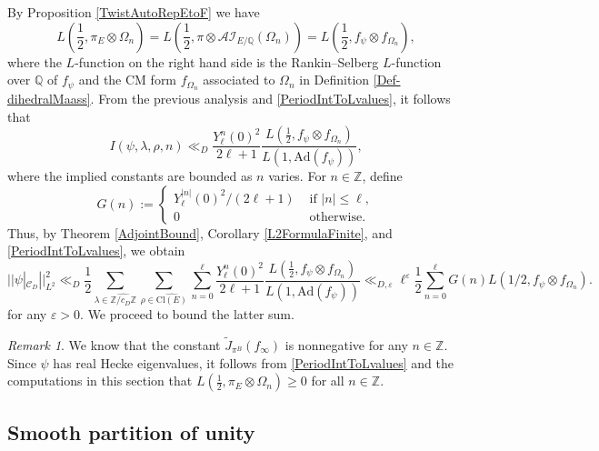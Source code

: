 \documentclass[11pt]{amsart}
\newcommand{\Z}{\mathbb{Z}}
\newcommand{\Q}{\mathbb{Q}}
\theoremstyle{definition}
\theoremstyle{remark}
\newtheorem{remark}[theorem]{Remark}
\begin{document}
By Proposition \ref{TwistAutoRepEtoF} we have $$ L\left(\frac{1}{2}, \pi_E \otimes \Omega_n \right) =  L\left(\frac{1}{2}, \pi \otimes \mathcal{AI}_{E/\Q}(\Omega_n)\right) = L\left( \frac{1}{2}, f_{\psi}\otimes f_{\Omega_n} \right),$$ where the $L$-function on the right hand side is the Rankin--Selberg $L$-function over $\Q$ of $f_{\psi}$ and the CM form $f_{\Omega_n}$ associated to $\Omega_n$ in Definition \ref{Def-dihedralMaass}. From the previous analysis and \eqref{PeriodIntToLvalues}, it follows that $$ I(\psi, \lambda, \rho, n) \ll_{D} \frac{Y_{\ell}^{n}(0)^2}{2\ell+1} \frac{L(\frac{1}{2},f_{\psi}\otimes f_{\Omega_n})}{L(1,\mathrm{Ad}(f_{\psi}))},$$ where the implied constants are bounded as $n$ varies. For $n\in \Z$, define $$ G(n) := \begin{cases}
    Y_{\ell}^{|n|}(0)^2/(2\ell+1) & \text{ if } |n|\leq \ell, \\
    0 & \text{ otherwise}.
\end{cases}$$ Thus, by Theorem \ref{AdjointBound}, Corollary \ref{L2FormulaFinite}, and \eqref{PeriodIntToLvalues}, we obtain 
\begin{equation}
    ||\psi|_{\mathcal{C}_{D}}||_{L^2}^{2} \ll_{D} \frac{1}{2} \sum_{\lambda \in \widehat{\Z/c_D \Z}} \sum_{\rho \in \widehat{\mathrm{Cl}(E)}} \sum_{n=0}^{\ell} \frac{Y_{\ell}^{n}(0)^2}{2\ell+1} \frac{L(\frac{1}{2},f_{\psi} \otimes f_{\Omega_n})}{L(1,\mathrm{Ad}(f_{\psi}))} \ll_{D,\varepsilon} \ell^{\varepsilon} \frac{1}{2} \sum_{n=0}^{\ell} G(n) L(1/2, f_{\psi}\otimes f_{\Omega_n}). \label{MainBound1}
\end{equation}
for any $\varepsilon>0$. We proceed to bound the latter sum.

\begin{remark}
We know that the constant $\tilde{J}_{\pi^B}(f_{\infty})$ is nonnegative for any $n\in \Z$. Since $\psi$ has real Hecke eigenvalues, it follows from \eqref{PeriodIntToLvalues} and the computations in this section that $L(\frac{1}{2},\pi_E \otimes \Omega_n) \geq 0$ for all $n\in \Z$.
\end{remark}




\subsection{Smooth partition of unity}\label{Sec-SPU}
\end{document}
